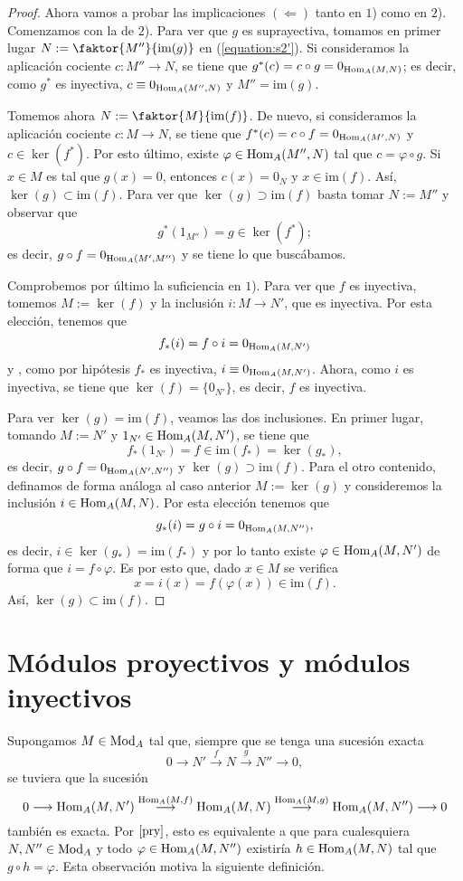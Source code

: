 \documentclass[../main.tex]{subfiles}
\begin{document}
\begin{proof}
	Ahora vamos a probar las implicaciones $(\Leftarrow)$ tanto en $1$) como en $2$). Comenzamos con la de $2$). Para ver que $g$ es suprayectiva, tomamos en primer lugar $N:=\faktor{M''}{\text{im}(g)}$ en (\ref{equation:s2'}). Si consideramos la aplicación cociente $c:M''\longrightarrow N$, se tiene que $g^*(c)=c\circ g=0_{\operatorname{Hom}_A(M,N)}$; es decir, como $g^*$ es inyectiva, $c\equiv 0_{\operatorname{Hom}_A(M'',N)}$ y $M''=\text{im}(g)$.

	Tomemos ahora $N:=\faktor{M}{\text{im}(f)}$. De nuevo, si consideramos la aplicación cociente $c:M\longrightarrow N$, se tiene que $f^*(c)=c\circ f=0_{\operatorname{Hom}_A(M',N)}$ y $c\in\ker(f^*)$. Por esto último, existe $\varphi\in\operatorname{Hom}_A(M'',N)$ tal que $c=\varphi\circ g$. Si $x\in M$ es tal que $g(x)=0$, entonces $c(x)=0_N$ y $x\in\text{im}(f)$. Así, $\ker(g)\subset\text{im}(f)$. Para ver que $\ker(g)\supset\text{im}(f)$ basta tomar $N:=M''$ y observar que $$g^*(1_{M''})=g\in\ker(f^*);$$ es decir, $g\circ f=0_{\operatorname{Hom}_A(M',M'')}$ y se tiene lo que buscábamos.

	Comprobemos por último la suficiencia en $1$). Para ver que $f$ es inyectiva, tomemos $M:=\ker(f)$ y la inclusión $i:M\longrightarrow N'$, que es inyectiva. Por esta elección, tenemos que
	$$f_*(i)=f\circ i=0_{\operatorname{Hom}_A(M,N')}$$
	y , como por hipótesis $f_*$ es inyectiva, $i\equiv 0_{\operatorname{Hom}_A(M,N')}$. Ahora, como $i$ es inyectiva, se tiene que $\ker(f)=\{0_{N'}\}$, es decir, $f$ es inyectiva.

	Para ver $\ker(g)=\text{im}(f)$, veamos las dos inclusiones. En primer lugar, tomando $M:=N'$ y $1_{N'}\in\operatorname{Hom}_A(M,N')$, se tiene que
	$$f_*(1_{N'})=f\in\text{im}(f_*)=\ker(g_*),$$
	es decir, $g\circ f=0_{\operatorname{Hom}_A(N',N'')}$ y $\ker(g)\supset\text{im}(f)$. Para el otro contenido, definamos de forma análoga al caso anterior $M:=\ker(g)$ y consideremos la inclusión $i\in\operatorname{Hom}_A(M,N)$. Por esta elección tenemos que
	$$g_*(i)=g\circ i=0_{\operatorname{Hom}_A(M,N'')},$$
	es decir, $i\in\ker(g_*)=\text{im}(f_*)$ y por lo tanto existe $\varphi\in\operatorname{Hom}_A(M,N')$ de forma que $i=f\circ\varphi$. Es por esto que, dado $x\in M$ se verifica
	$$x=i(x)=f(\varphi(x))\in\text{im}(f).$$
	Así, $\ker(g)\subset\text{im}(f)$.
\end{proof}

\section{Módulos proyectivos y módulos inyectivos}
Supongamos $M\in\operatorname{Mod}_A$ tal que, siempre que se tenga una sucesión exacta
$$0\longrightarrow N'\overset{f}{\longrightarrow}N\overset{g}{\longrightarrow}N''\longrightarrow 0,$$
se tuviera que la sucesión
$$0\longrightarrow \operatorname{Hom}_A(M,N')\overset{\operatorname{Hom}_A(M,f)}{\longrightarrow}\operatorname{Hom}_A(M,N)\overset{\operatorname{Hom}_A(M,g)}{\longrightarrow}\operatorname{Hom}_A(M,N'')\longrightarrow0$$
también es exacta. Por $\ref{pry}$, esto es equivalente a que para cualesquiera $N,N''\in\operatorname{Mod}_A$ y todo $\varphi\in\operatorname{Hom}_A(M,N'')$ existiría $h\in\operatorname{Hom}_A(M,N)$ tal que $g\circ h=\varphi$. Esta observación motiva la siguiente definición.
\end{document}
